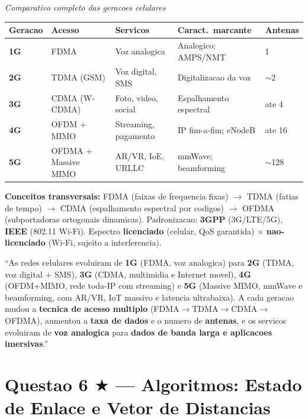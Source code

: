 \documentclass[11pt,a4paper]{article}
\begin{document}
\begin{explicacao}
\begin{center}
{\small\textit{Comparativo completo das geracoes celulares}}\\[4pt]
\begin{tabular}{lllll}
\toprule
\textbf{Geracao} & \textbf{Acesso} & \textbf{Servicos} & \textbf{Caract.\ marcante} & \textbf{Antenas} \\
\midrule
\textbf{1G} & FDMA & Voz analogica & Analogico; AMPS/NMT & 1 \\
\textbf{2G} & TDMA (GSM) & Voz digital, SMS & Digitalizacao da voz & $\sim$2 \\
\textbf{3G} & CDMA (W-CDMA) & Foto, video, social & Espalhamento espectral & ate 4 \\
\textbf{4G} & OFDM + MIMO & Streaming, pagamento & IP fim-a-fim; eNodeB & ate 16 \\
\textbf{5G} & OFDMA + Massive MIMO & AR/VR, IoE, URLLC & mmWave; beamforming & $\sim$128 \\
\bottomrule
\end{tabular}
\end{center}

\textbf{Conceitos transversais:} FDMA (faixas de frequencia fixas) $\to$ TDMA (fatias de tempo) $\to$ CDMA (espalhamento espectral por codigos) $\to$ OFDMA (subportadoras ortogonais dinamicas). Padronizacao: \textbf{3GPP} (3G/LTE/5G), \textbf{IEEE} (802.11 Wi-Fi). Espectro \textbf{licenciado} (celular, QoS garantida) $\times$ \textbf{nao-licenciado} (Wi-Fi, sujeito a interferencia).
\end{explicacao}

\begin{resposta}
``As redes celulares evoluiram de \textbf{1G} (FDMA, voz analogica) para \textbf{2G} (TDMA, voz digital + SMS), \textbf{3G} (CDMA, multimidia e Internet movel), \textbf{4G} (OFDM+MIMO, rede toda-IP com streaming) e \textbf{5G} (Massive MIMO, mmWave e beamforming, com AR/VR, IoT massivo e latencia ultrabaixa). A cada geracao mudou a \textbf{tecnica de acesso multiplo} (FDMA$\to$TDMA$\to$CDMA$\to$OFDMA), aumentou a \textbf{taxa de dados} e o numero de \textbf{antenas}, e os servicos evoluiram de \textbf{voz analogica} para \textbf{dados de banda larga e aplicacoes imersivas}.''
\end{resposta}

\hrulefill

\section*{Questao 6 $\bigstar$ --- Algoritmos: Estado de Enlace e Vetor de Distancias}
\end{document}
